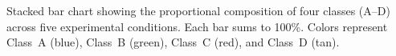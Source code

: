 \caption{Stacked bar chart showing the proportional composition of four classes (A--D) across five experimental conditions. Each bar sums to 100\%. Colors represent Class~A (blue), Class~B (green), Class~C (red), and Class~D (tan).}
